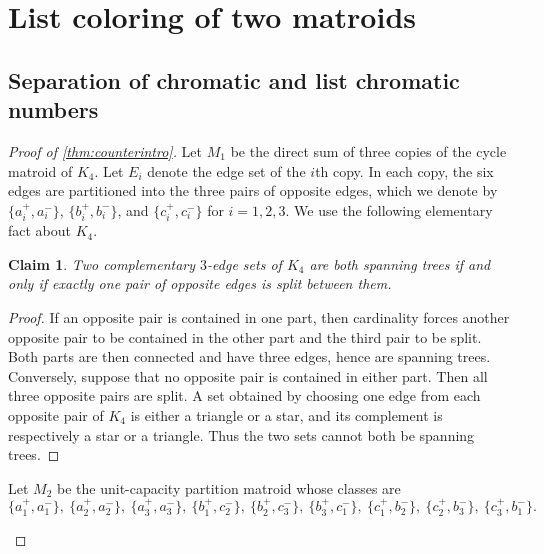 \documentclass{article}
\theoremstyle{plain}
\newtheorem{cla}[thm]{Claim}
\theoremstyle{definition}
\begin{document}
\section{List coloring of two matroids}
\label{sec:intersection}

\subsection{Separation of chromatic and list chromatic numbers}
\label{sec:counterexample}

\begin{proof}[Proof of \cref{thm:counterintro}]
Let $M_1$ be the direct sum of three copies of the cycle matroid of $K_4$. Let $E_i$ denote the edge set of the $i$th copy. In each copy, the six edges are partitioned into the three pairs of opposite edges, which we denote by $\{a_i^+,a_i^-\}$, $\{b_i^+,b_i^-\}$, and $\{c_i^+,c_i^-\}$ for $i=1,2,3$. We use the following elementary fact about $K_4$.

\begin{cla}\label{cla:k4}
Two complementary $3$-edge sets of $K_4$ are both spanning trees if and only if exactly one pair of opposite edges is split between them.
\end{cla}

\begin{proof}
If an opposite pair is contained in one part, then cardinality forces another opposite pair to be contained in the other part and the third pair to be split. Both parts are then connected and have three edges, hence are spanning trees. Conversely, suppose that no opposite pair is contained in either part. Then all three opposite pairs are split. A set obtained by choosing one edge from each opposite pair of $K_4$ is either a triangle or a star, and its complement is respectively a star or a triangle. Thus the two sets cannot both be spanning trees.
\end{proof}

Let $M_2$ be the unit-capacity partition matroid whose classes are
\[
\{a_1^+,a_1^-\},\ \{a_2^+,a_2^-\},\ \{a_3^+,a_3^-\},\ 
\{b_1^+,c_2^-\},\ \{b_2^+,c_3^-\},\ \{b_3^+,c_1^-\},\ 
\{c_1^+,b_2^-\},\ \{c_2^+,b_3^-\},\ \{c_3^+,b_1^-\}.
\]

\begin{figure}[t]
\centering
{}
\end{figure}
\end{proof}
\end{document}
